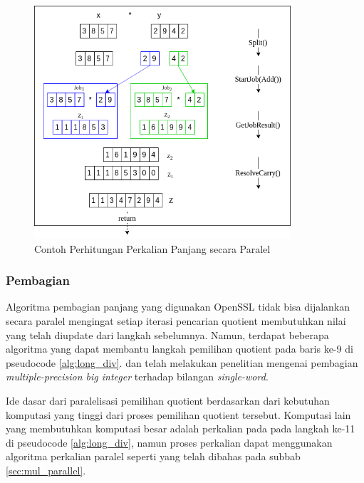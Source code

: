         \begin{figure}
            \centering
            \includegraphics[width=0.85\textwidth]{resources/img/ch-3/mul-normal-example.png}
            \caption{Contoh Perhitungan Perkalian Panjang secara Paralel}
            \label{fig:mul_normal_example}
        \end{figure}


    \subsubsection{Pembagian}\label{sec:div_parallel}
      Algoritma pembagian panjang yang digunakan OpenSSL tidak bisa dijalankan secara paralel mengingat setiap iterasi pencarian quotient membutuhkan nilai yang telah diupdate dari langkah sebelumnya. Namun, terdapat beberapa algoritma yang dapat membantu langkah pemilihan quotient pada baris ke-9 di pseudocode \ref{alg:long_div}. \citet{parallel_short_div_emmart} dan \citet{parallel_short_div_takahashi} telah melakukan penelitian mengenai pembagian \textit{multiple-precision big integer} terhadap bilangan \textit{single-word}.

      Ide dasar dari paralelisasi pemilihan quotient berdasarkan dari kebutuhan komputasi yang tinggi dari proses pemilihan quotient tersebut. Komputasi lain yang membutuhkan komputasi besar adalah perkalian pada pada langkah ke-11 di pseudocode \ref{alg:long_div}, namun proses perkalian dapat menggunakan algoritma perkalian paralel seperti yang telah dibahas pada subbab \ref{sec:mul_parallel}.

